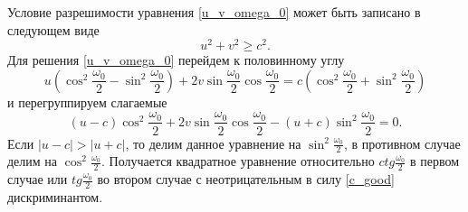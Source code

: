 \documentclass[../main.tex]{subfiles}
\begin{document}
Условие разрешимости уравнения \eqref {u_v_omega_0} может быть записано в следующем виде
\begin {equation}
    u^2+v^2\geq c^2.
  \label {c_good}
\end {equation}
Для решения \eqref {u_v_omega_0} перейдем к половинному углу
\begin {equation*}
    u \left (\cos^2 \frac {\omega_0} {2} - \sin^2 \frac {\omega_0} {2} \right ) + 2v \sin \frac {\omega_0} {2} \cos \frac {\omega_0} {2}  = c \left (\cos^2 \frac {\omega_0} {2} + \sin^2 \frac {\omega_0} {2} \right)
\end {equation*}
и перегруппируем слагаемые
\begin {equation*}
    (u-c) \cos^2 \frac {\omega_0} {2}  + 2v \sin \frac {\omega_0} {2} \cos \frac {\omega_0} {2}  - (u+c) \sin^2 \frac {\omega_0} {2} = 0 .
\end {equation*}
Если $|u-c|>|u+c|$, то делим данное уравнение на $\sin^2 \frac {\omega_0} {2}$, в противном случае делим на $\cos^2 \frac {\omega_0} {2}$. Получается квадратное уравнение относительно $ctg \frac {\omega_0} {2}$ в первом случае или $tg \frac {\omega_0} {2}$ во втором случае с неотрицательным в силу \eqref {c_good} дискриминантом.
\end{document}
